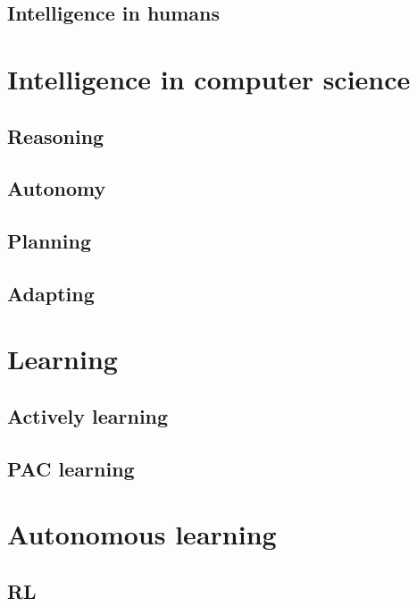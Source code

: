 \documentclass[12pt,a4paper,openright,twoside]{book}
\begin{document}
\subsection{Intelligence in humans}\label{subsec:intelligence-in-humans}

\section{Intelligence in computer science}\label{sec:intelligence-in-computer-science}

\subsection{Reasoning}\label{subsec:reasoning}

\subsection{Autonomy}\label{subsec:autonomy}

\subsection{Planning}\label{subsec:planning}

\subsection{Adapting}\label{subsec:adapting}

\section{Learning}\label{sec:learning}

\subsection{Actively learning}\label{subsec:actively-learning}

\subsection{\Acl{PAC} learning}\label{subsec:pac-learning}

\section{Autonomous learning}\label{sec:autonomous-learning}

\subsection{\Acl{RL}}\label{subsec:rl}
\end{document}
